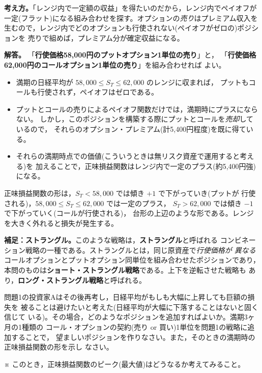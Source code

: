 \begin{answerbox}
\textbf{考え方。}「レンジ内で一定額の収益」を得たいのだから，レンジ内でペイオフが
一定(フラット)になる組み合わせを探す。オプションの\emph{売り}はプレミアム収入を
生むので，レンジ内でどのオプションも行使されない(ペイオフがゼロの)ポジションを
売りで組めば，プレミアム分が確定収益になる。

\medskip
\textbf{解答。}
「\textbf{行使価格58,000円のプットオプション1単位の売り}」と，
「\textbf{行使価格62,000円のコールオプション1単位の売り}」を組み合わせれば
よい。

\begin{itemize}
\item 満期の日経平均が $58{,}000 \leq S_T \leq 62{,}000$ のレンジに収まれば，
プットもコールも行使されず，ペイオフはゼロである。
\item プットとコールの売りによるペイオフ関数だけでは，満期時にプラスにならない。
しかし，このポジションを構築する際にプットとコールを\emph{売却}しているので，
それらのオプション・プレミアム(計5,400円程度)を既に得ている。
\item それらの満期時点での価値(こういうときは無リスク資産で運用すると考える)を
加えることで，正味損益関数はレンジ内で一定のプラス(約5,400円強)になる。
\end{itemize}

正味損益関数の形は，$S_T < 58{,}000$ では傾き $+1$ で下がっていき(プットが
行使される)，$58{,}000\leq S_T\leq 62{,}000$ では一定のプラス，
$S_T > 62{,}000$ では傾き $-1$ で下がっていく(コールが行使される)，
台形の上辺のような形である。レンジを大きく外れると損失が発生する。

\medskip
\textbf{補足：ストラングル。}このような戦略は，\textbf{ストラングル}と呼ばれる
コンビネーション戦略の一種である。ストラングルとは，同じ原資産で\emph{行使価格が
異なる}コールオプションとプットオプション同単位を組み合わせたポジションであり，
本問のものは\textbf{ショート・ストラングル戦略}である。上下を逆転させた戦略も
あり，\textbf{ロング・ストラングル戦略}と呼ばれる。
\end{answerbox}

\begin{exercise}[問題2]
問題1の投資家Aはその後再考し，日経平均がもしも大幅に上昇しても巨額の損失を
被ることは避けたいと考えた(日経平均が大幅に下落することはないと固く信じて
いる)。その場合，どのようなポジションを追加すればよいか。満期3ヶ月の1種類の
コール・オプションの契約(売り or 買い)1単位を問題1の戦略に追加することで，
望ましいポジションを作りなさい。また，そのときの満期時の正味損益関数の形を示し
なさい。

※ このとき，正味損益関数のピーク(最大値)はどうなるか考えてみること。
\end{exercise}

